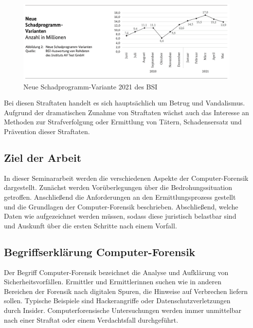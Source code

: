 \documentclass[12pt,DIV=14, version=first, BCOR=10mm,a4paper,twoside,parskip=half-,headsepline,headinclude]{scrartcl}
\begin{document}
	\begin{figure}[h] 
		\centering %
		\includegraphics[width=1\textwidth]{bilder/stat_Schadprogramm.png} 
		\caption{Neue Schadprogramm-Variante 2021 des BSI \cite[S. 11]{BSI_lagebericht}} 
		\label{fig:stat}
	\end{figure}
	
	Bei diesen Straftaten handelt es sich hauptsächlich um Betrug und Vandalismus. Aufgrund der dramatischen Zunahme von Straftaten wächst auch das Interesse an Methoden zur Strafverfolgung oder Ermittlung von Tätern, Schadensersatz und Prävention dieser Straftaten.
	
	\subsection{Ziel der Arbeit}
	In dieser Seminararbeit werden die verschiedenen Aspekte der Computer-Forensik dargestellt. Zunächst werden Vorüberlegungen über die Bedrohungssituation getroffen. Anschließend die Anforderungen an den Ermittlungsprozess gestellt und die Grundlagen der Computer-Forensik beschrieben. Abschließend, welche Daten wie aufgezeichnet werden müssen, sodass diese juristisch belastbar sind und Auskunft über die ersten Schritte nach einem Vorfall.
	
	\subsection {Begriffserklärung Computer-Forensik}
	Der Begriff Computer-Forensik bezeichnet die Analyse und Aufklärung von Sicherheitsvorfällen. Ermittler und Ermittlerinnen suchen wie in anderen Bereichen der Forensik nach digitalen Spuren, die Hinweise auf Verbrechen liefern sollen. Typische Beispiele sind Hackerangriffe oder Datenschutzverletzungen durch Insider. Computerforensische Untersuchungen werden immer unmittelbar nach einer Straftat oder einem Verdachtsfall durchgeführt.
\end{document}

